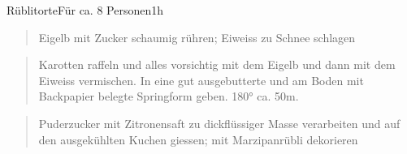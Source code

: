 \documentclass[
  a4paper,
]{article}
\begin{document}
\begin{recipe}{Rüblitorte}{Für ca. 8 Personen}{1h}


\begin{quote}
Eigelb mit Zucker schaumig rühren; Eiweiss zu Schnee schlagen
\end{quote}

\freeform\hrulefill


\begin{quote}
Karotten raffeln und alles vorsichtig mit dem Eigelb und dann mit dem
Eiweiss vermischen. In eine gut ausgebutterte und am Boden mit
Backpapier belegte Springform geben. 180° ca. 50m.
\end{quote}

\freeform\hrulefill


\begin{quote}
Puderzucker mit Zitronensaft zu dickflüssiger Masse verarbeiten und auf
den ausgekühlten Kuchen giessen; mit Marzipanrübli dekorieren
\end{quote}

\freeform\hrulefill\newline\freeform{}\end{recipe}

\newpage
\end{document}
